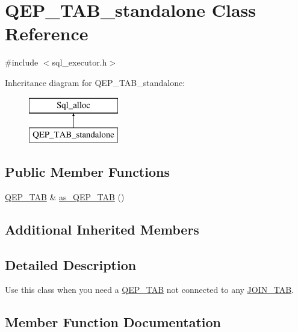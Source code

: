 \hypertarget{classQEP__TAB__standalone}{}\section{Q\+E\+P\+\_\+\+T\+A\+B\+\_\+standalone Class Reference}
\label{classQEP__TAB__standalone}


{\ttfamily \#include $<$sql\+\_\+executor.\+h$>$}

Inheritance diagram for Q\+E\+P\+\_\+\+T\+A\+B\+\_\+standalone\+:\begin{figure}[H]
\begin{center}
\leavevmode
\includegraphics[height=2.000000cm]{classQEP__TAB__standalone}
\end{center}
\end{figure}
\subsection*{Public Member Functions}
\begin{DoxyCompactItemize}
\item 
\mbox{\hyperlink{classQEP__TAB}{Q\+E\+P\+\_\+\+T\+AB}} \& \mbox{\hyperlink{classQEP__TAB__standalone_aa6a1cc563d8a202b36946747babd6799}{as\+\_\+\+Q\+E\+P\+\_\+\+T\+AB}} ()
\end{DoxyCompactItemize}
\subsection*{Additional Inherited Members}


\subsection{Detailed Description}
Use this class when you need a \mbox{\hyperlink{classQEP__TAB}{Q\+E\+P\+\_\+\+T\+AB}} not connected to any \mbox{\hyperlink{classJOIN__TAB}{J\+O\+I\+N\+\_\+\+T\+AB}}. 

\subsection{Member Function Documentation}
\mbox{\label{classQEP__TAB__standalone_aa6a1cc563d8a202b36946747babd6799}} 
